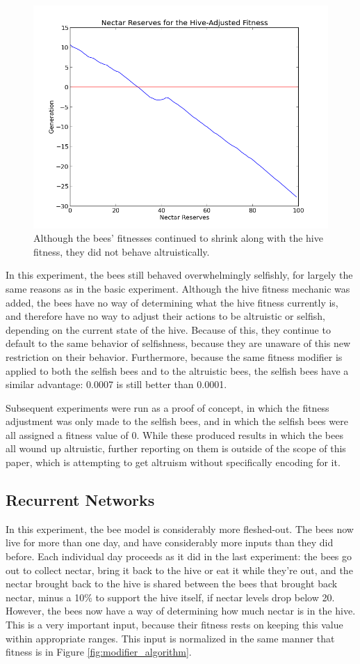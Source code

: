 \documentclass[twoside]{article}
\begin{document}
\begin{multicols}{2}
			\begin{figure}[H]
				\begin{center}
					\includegraphics[width=.5\textwidth]{results/hive_fitness_res.png}
				\end{center}
				\caption{Although the bees' fitnesses continued to shrink along with the hive fitness, they did not behave altruistically.}
				\label{fig:hive_fitness_reserves}
			\end{figure}

			In this experiment, the bees still behaved overwhelmingly selfishly, for largely the same reasons as in the basic experiment. Although the hive fitness mechanic was added, the bees have no way of determining what the hive fitness currently is, and therefore have no way to adjust their actions to be altruistic or selfish, depending on the current state of the hive. Because of this, they continue to default to the same behavior of selfishness, because they are unaware of this new restriction on their behavior. Furthermore, because the same fitness modifier is applied to both the selfish bees and to the altruistic bees, the selfish bees have a similar advantage: 0.0007 is still better than 0.0001.

			Subsequent experiments were run as a proof of concept, in which the fitness adjustment was only made to the selfish bees, and in which the selfish bees were all assigned a fitness value of 0. While these produced results in which the bees all wound up altruistic, further reporting on them is outside of the scope of this paper, which is attempting to get altruism without specifically encoding for it.

		\subsection{Recurrent Networks} %
			\label{sub:recurrent_networks}


			In this experiment, the bee model is considerably more fleshed-out. The bees now live for more than one day, and have considerably more inputs than they did before. Each individual day proceeds as it did in the last experiment: the bees go out to collect nectar, bring it back to the hive or eat it while they're out, and the nectar brought back to the hive is shared between the bees that brought back nectar, minus a 10\% to support the hive itself, if nectar levels drop below 20. However, the bees now have a way of determining how much nectar is in the hive. This is a very important input, because their fitness rests on keeping this value within appropriate ranges. This input is normalized in the same manner that fitness is in Figure \ref{fig:modifier_algorithm}.


\end{multicols}
\end{document}
